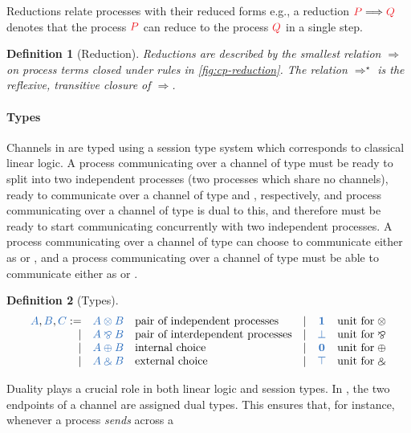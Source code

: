 \documentclass[draft,submission,copyright,creativecommons]{eptcs}
\makeatletter
\newtheorem{definition}{Definition}
\renewcommand*{\eg}{e.g.\@\xspace}
\makeatother
\begin{document}
Reductions relate processes with their reduced forms \eg, a reduction
$\reducesto{P}{Q}$ denotes that the process $\tm{P}$ can reduce to the process
$\tm{Q}$ in a single step.
\begin{definition}[Reduction]\label{def:cp-reduction}
  Reductions are described by the smallest relation $\Longrightarrow$ on process
  terms closed under rules in \cref{fig:cp-reduction}.
  The relation $\Longrightarrow^\star$ is the reflexive, transitive closure of 
  $\Longrightarrow$.
\end{definition}\noindent

\paragraph{Types}
Channels in \cp are typed using a session type system which corresponds to
classical linear logic.
A process communicating over a channel of type  must be ready to
split into two independent processes (two processes which share no
channels), ready to communicate over a channel of type  and ,
respectively, and process communicating over a channel of type  is
dual to this, and therefore must be ready to start communicating concurrently
with two independent processes.
A process communicating over a channel of type  can choose to
communicate either as  or , and a process communicating over a
channel of type  must be able to communicate either as  or
.
\begin{definition}[Types]\label{def:cp-types}
  \[
    \begin{array}{rclrcl}
      \ty{A}, \ty{B}, \ty{C}
           :=& \ty{A \tens B} &\text{pair of independent processes}
      &  \mid& \ty{\one}      &\text{unit for} \; {\tens}
      \\ \mid& \ty{A \parr B} &\text{pair of interdependent processes}
      &  \mid& \ty{\bot}      &\text{unit for} \; {\parr}
      \\ \mid& \ty{A \plus B} &\text{internal choice}
      &  \mid& \ty{\nil}      &\text{unit for} \; {\plus}
      \\ \mid& \ty{A \with B} &\text{external choice}
      &  \mid& \ty{\top}      &\text{unit for} \; {\with}
    \end{array}
  \]
\end{definition}\noindent
Duality plays a crucial role in both linear logic and session types.
In \cp, the two endpoints of a channel are assigned dual types.
This ensures that, for instance, whenever a process \emph{sends} across a
\end{document}

